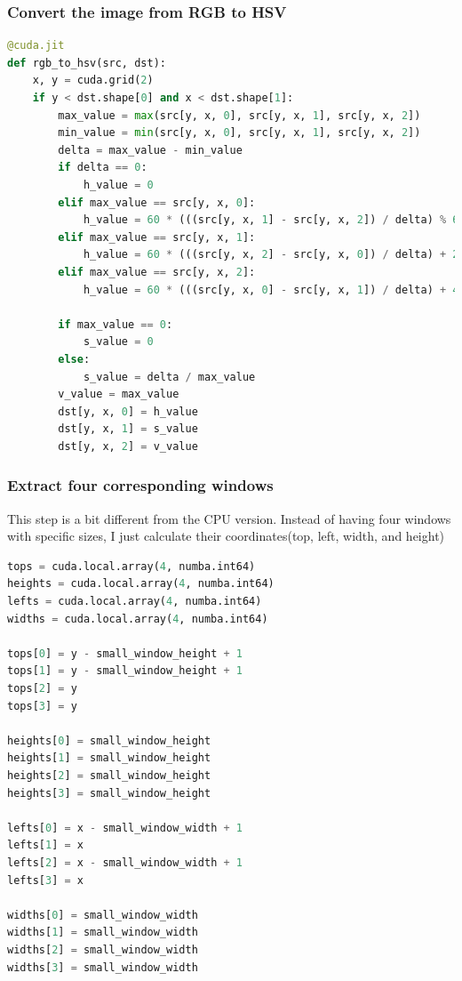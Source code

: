 \documentclass[12pt]{article}
\begin{document}
\subsubsection{Convert the image from RGB to HSV}
\begin{lstlisting}[language=Python]
@cuda.jit
def rgb_to_hsv(src, dst):
    x, y = cuda.grid(2)
    if y < dst.shape[0] and x < dst.shape[1]:
        max_value = max(src[y, x, 0], src[y, x, 1], src[y, x, 2])
        min_value = min(src[y, x, 0], src[y, x, 1], src[y, x, 2])
        delta = max_value - min_value
        if delta == 0:
            h_value = 0
        elif max_value == src[y, x, 0]:
            h_value = 60 * (((src[y, x, 1] - src[y, x, 2]) / delta) % 6)
        elif max_value == src[y, x, 1]:
            h_value = 60 * (((src[y, x, 2] - src[y, x, 0]) / delta) + 2)
        elif max_value == src[y, x, 2]:
            h_value = 60 * (((src[y, x, 0] - src[y, x, 1]) / delta) + 4)

        if max_value == 0:
            s_value = 0
        else:
            s_value = delta / max_value
        v_value = max_value
        dst[y, x, 0] = h_value
        dst[y, x, 1] = s_value
        dst[y, x, 2] = v_value
\end{lstlisting}


\subsubsection{Extract four corresponding windows}

\noindent
This step is a bit different from the CPU version. Instead of having four windows with specific sizes, I just calculate their coordinates(top, left, width, and height)
\begin{lstlisting}[language=Python]
tops = cuda.local.array(4, numba.int64)
heights = cuda.local.array(4, numba.int64)
lefts = cuda.local.array(4, numba.int64)
widths = cuda.local.array(4, numba.int64)

tops[0] = y - small_window_height + 1
tops[1] = y - small_window_height + 1
tops[2] = y
tops[3] = y

heights[0] = small_window_height
heights[1] = small_window_height
heights[2] = small_window_height
heights[3] = small_window_height

lefts[0] = x - small_window_width + 1
lefts[1] = x
lefts[2] = x - small_window_width + 1
lefts[3] = x

widths[0] = small_window_width
widths[1] = small_window_width
widths[2] = small_window_width
widths[3] = small_window_width

\end{lstlisting}
\end{document}
